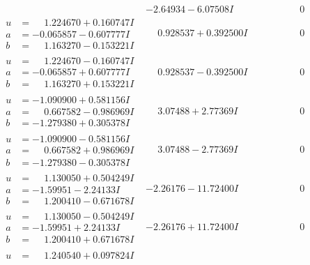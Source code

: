 \documentclass[1p]{elsarticle_modified}
\theoremstyle{definition}
\begin{document}
$$\begin{array}{c|c|c}
 & -2.64934 - 6.07508 I & \phantom{-0.000000 } 0 \\ \hline\begin{aligned}
u &= \phantom{-}1.224670 + 0.160747 I \\
a &= -0.065857 - 0.607777 I \\
b &= \phantom{-}1.163270 - 0.153221 I\end{aligned}
 & \phantom{-}0.928537 + 0.392500 I & \phantom{-0.000000 } 0 \\ \hline\begin{aligned}
u &= \phantom{-}1.224670 - 0.160747 I \\
a &= -0.065857 + 0.607777 I \\
b &= \phantom{-}1.163270 + 0.153221 I\end{aligned}
 & \phantom{-}0.928537 - 0.392500 I & \phantom{-0.000000 } 0 \\ \hline\begin{aligned}
u &= -1.090900 + 0.581156 I \\
a &= \phantom{-}0.667582 - 0.986969 I \\
b &= -1.279380 + 0.305378 I\end{aligned}
 & \phantom{-}3.07488 + 2.77369 I & \phantom{-0.000000 } 0 \\ \hline\begin{aligned}
u &= -1.090900 - 0.581156 I \\
a &= \phantom{-}0.667582 + 0.986969 I \\
b &= -1.279380 - 0.305378 I\end{aligned}
 & \phantom{-}3.07488 - 2.77369 I & \phantom{-0.000000 } 0 \\ \hline\begin{aligned}
u &= \phantom{-}1.130050 + 0.504249 I \\
a &= -1.59951 - 2.24133 I \\
b &= \phantom{-}1.200410 - 0.671678 I\end{aligned}
 & -2.26176 - 11.72400 I & \phantom{-0.000000 } 0 \\ \hline\begin{aligned}
u &= \phantom{-}1.130050 - 0.504249 I \\
a &= -1.59951 + 2.24133 I \\
b &= \phantom{-}1.200410 + 0.671678 I\end{aligned}
 & -2.26176 + 11.72400 I & \phantom{-0.000000 } 0 \\ \hline\begin{aligned}
u &= \phantom{-}1.240540 + 0.097824 I \\

\end{aligned}
\end{array}$$
\end{document}
